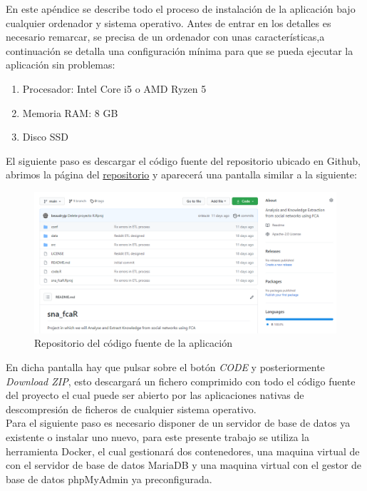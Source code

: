 \documentclass[../../main.tex]{subfiles}
\begin{document}
En este apéndice se describe todo el proceso de instalación de la aplicación bajo cualquier ordenador y sistema operativo.
Antes de entrar en los detalles es necesario remarcar, se precisa de un ordenador con unas características,a continuación se detalla una configuración mínima para que se pueda ejecutar la aplicación sin problemas:
\begin{enumerate}
\item Procesador: Intel Core i5 o AMD Ryzen 5
\item Memoria RAM: 8 GB
\item Disco SSD
\end{enumerate}

El siguiente paso es descargar el código fuente del repositorio ubicado en Github, abrimos la página del  \href{https://github.com/beaudryjp/sna_fcaR}{repositorio} y aparecerá una pantalla similar a la siguiente:

\begin{figure}[h]
\centering
\includegraphics[width=\textwidth]{images/0_apendices/github1.png}
\caption{Repositorio del código fuente de la aplicación}
\end{figure}

En dicha pantalla hay que pulsar sobre el botón \textit{CODE} y posteriormente \textit{Download ZIP}, esto descargará un fichero comprimido con todo el código fuente del proyecto el cual puede ser abierto por las aplicaciones nativas de descompresión de ficheros de cualquier sistema operativo. \\


Para el siguiente paso es necesario disponer de un servidor de base de datos ya existente o instalar uno nuevo, para este presente trabajo se utiliza la herramienta Docker\cite{doc10}, el cual gestionará dos contenedores, una maquina virtual de con el servidor de base de datos MariaDB\cite{doc11} y una maquina virtual con el gestor de base de datos phpMyAdmin\cite{doc12} ya preconfigurada.\\
\end{document}
